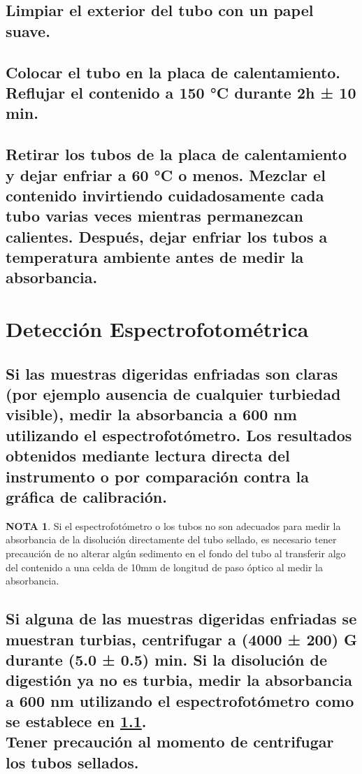 \documentclass[spanish,12pt,letterpaper,titlepage]{article}
\theoremstyle{definition}
\newtheorem{teor}{NOTA}
\begin{document}
	\subsection{Limpiar el exterior del tubo con un papel suave.} \label{10.1.7}
	\subsection{Colocar el tubo en la placa de calentamiento. Reflujar el contenido a 150 °C durante 2h ± 10 min.} \label{10.1.8}
	\subsection{Retirar los tubos de la placa de calentamiento y dejar enfriar a 60 °C o menos. Mezclar el contenido invirtiendo cuidadosamente cada tubo varias veces mientras permanezcan calientes. Después, dejar enfriar los tubos a temperatura ambiente antes de medir la absorbancia.} \label{10.1.9}
	\section{Detección Espectrofotométrica} \label{10.2}
	\subsection{Si las muestras digeridas enfriadas son claras (por ejemplo ausencia de cualquier turbiedad visible), medir la absorbancia a 600 nm utilizando el espectrofotómetro. Los resultados obtenidos mediante lectura directa del instrumento o por comparación contra la gráfica de calibración.} \label{10.2.1}
	\begin{teor}
		Si el espectrofotómetro o los tubos no son adecuados para medir la absorbancia de la disolución directamente del tubo sellado, es necesario tener precaución de no alterar algún sedimento en el fondo del tubo al transferir algo del contenido a una celda de 10mm de longitud de paso óptico al medir la absorbancia.
	\end{teor}
	\subsection{Si alguna de las muestras digeridas enfriadas se muestran turbias, centrifugar a (4000 ± 200) G durante (5.0 ± 0.5) min. Si la disolución de digestión ya no es turbia, medir la absorbancia a 600 nm utilizando el espectrofotómetro como se establece en \ref{10.2.1}.\\Tener precaución al momento de centrifugar los tubos sellados.} \label{10.2.2}
\end{document}
